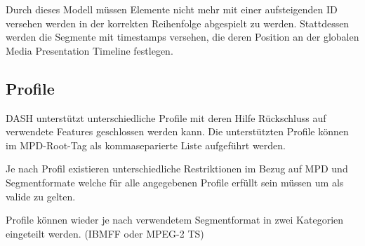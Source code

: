 \documentclass[paper = a4, fontsize = 12pt, parskip = half]{scrartcl} %
\begin{document}
Durch dieses Modell müssen Elemente nicht mehr mit einer aufsteigenden ID versehen werden in der korrekten Reihenfolge abgespielt zu werden. Stattdessen werden die Segmente mit timestamps versehen, die deren Position an der globalen Media Presentation Timeline festlegen.


\subsection{Profile}
\label{profiles}
DASH unterstützt unterschiedliche Profile mit deren Hilfe Rückschluss auf verwendete Features geschlossen werden kann. Die unterstützten Profile können im MPD-Root-Tag als kommaseparierte Liste aufgeführt werden.

Je nach Profil existieren unterschiedliche Restriktionen im Bezug auf MPD und Segmentformate welche für alle angegebenen Profile erfüllt sein müssen um als valide zu gelten.

Profile können wieder je nach verwendetem Segmentformat in zwei Kategorien eingeteilt werden. (IBMFF oder MPEG-2 TS)
\end{document}
